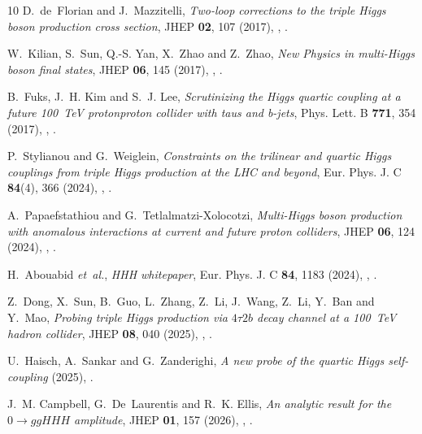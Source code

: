\documentclass{SciPost}
\begin{document}
\begin{thebibliography}{10}
D.~de~Florian and J.~Mazzitelli,
\newblock \emph{{Two-loop corrections to the triple Higgs boson production cross section}},
\newblock JHEP \textbf{02}, 107 (2017),
\newblock {},
\newblock {}.

W.~Kilian, S.~Sun, Q.-S. Yan, X.~Zhao and Z.~Zhao,
\newblock \emph{{New Physics in multi-Higgs boson final states}},
\newblock JHEP \textbf{06}, 145 (2017),
\newblock {},
\newblock {}.

B.~Fuks, J.~H. Kim and S.~J. Lee,
\newblock \emph{{Scrutinizing the Higgs quartic coupling at a future 100~TeV proton\textendash{}proton collider with taus and b-jets}},
\newblock Phys. Lett. B \textbf{771}, 354 (2017),
\newblock {},
\newblock {}.

P.~Stylianou and G.~Weiglein,
\newblock \emph{{Constraints on the trilinear and quartic Higgs couplings from triple Higgs production at the LHC and beyond}},
\newblock Eur. Phys. J. C \textbf{84}(4), 366 (2024),
\newblock {},
\newblock {}.

A.~Papaefstathiou and G.~Tetlalmatzi-Xolocotzi,
\newblock \emph{{Multi-Higgs boson production with anomalous interactions at current and future proton colliders}},
\newblock JHEP \textbf{06}, 124 (2024),
\newblock {},
\newblock {}.

H.~Abouabid \emph{et~al.},
\newblock \emph{{HHH whitepaper}},
\newblock Eur. Phys. J. C \textbf{84}, 1183 (2024),
\newblock {},
\newblock {}.

Z.~Dong, X.~Sun, B.~Guo, L.~Zhang, Z.~Li, J.~Wang, Z.~Li, Y.~Ban and Y.~Mao,
\newblock \emph{{Probing triple Higgs production via $4\tau 2b$ decay channel at a 100~TeV hadron collider}},
\newblock JHEP \textbf{08}, 040 (2025),
\newblock {},
\newblock {}.

U.~Haisch, A.~Sankar and G.~Zanderighi,
\newblock \emph{{A new probe of the quartic Higgs self-coupling}}  (2025),
\newblock {}.

J.~M. Campbell, G.~De~Laurentis and R.~K. Ellis,
\newblock \emph{{An analytic result for the $0 \to ggHHH$ amplitude}},
\newblock JHEP \textbf{01}, 157 (2026),
\newblock {},
\newblock {}.


\end{thebibliography}
\end{document}
